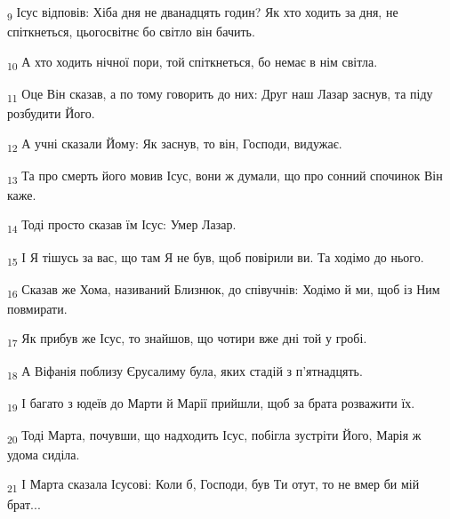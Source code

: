 \begin{tcolorbox}
\textsubscript{9} Ісус відповів: Хіба дня не дванадцять годин? Як хто ходить за дня, не спіткнеться, цьогосвітнє бо світло він бачить.
\end{tcolorbox}
\begin{tcolorbox}
\textsubscript{10} А хто ходить нічної пори, той спіткнеться, бо немає в нім світла.
\end{tcolorbox}
\begin{tcolorbox}
\textsubscript{11} Оце Він сказав, а по тому говорить до них: Друг наш Лазар заснув, та піду розбудити Його.
\end{tcolorbox}
\begin{tcolorbox}
\textsubscript{12} А учні сказали Йому: Як заснув, то він, Господи, видужає.
\end{tcolorbox}
\begin{tcolorbox}
\textsubscript{13} Та про смерть його мовив Ісус, вони ж думали, що про сонний спочинок Він каже.
\end{tcolorbox}
\begin{tcolorbox}
\textsubscript{14} Тоді просто сказав їм Ісус: Умер Лазар.
\end{tcolorbox}
\begin{tcolorbox}
\textsubscript{15} І Я тішусь за вас, що там Я не був, щоб повірили ви. Та ходімо до нього.
\end{tcolorbox}
\begin{tcolorbox}
\textsubscript{16} Сказав же Хома, називаний Близнюк, до співучнів: Ходімо й ми, щоб із Ним повмирати.
\end{tcolorbox}
\begin{tcolorbox}
\textsubscript{17} Як прибув же Ісус, то знайшов, що чотири вже дні той у гробі.
\end{tcolorbox}
\begin{tcolorbox}
\textsubscript{18} А Віфанія поблизу Єрусалиму була, яких стадій з п'ятнадцять.
\end{tcolorbox}
\begin{tcolorbox}
\textsubscript{19} І багато з юдеїв до Марти й Марії прийшли, щоб за брата розважити їх.
\end{tcolorbox}
\begin{tcolorbox}
\textsubscript{20} Тоді Марта, почувши, що надходить Ісус, побігла зустріти Його, Марія ж удома сиділа.
\end{tcolorbox}
\begin{tcolorbox}
\textsubscript{21} І Марта сказала Ісусові: Коли б, Господи, був Ти отут, то не вмер би мій брат...
\end{tcolorbox}
